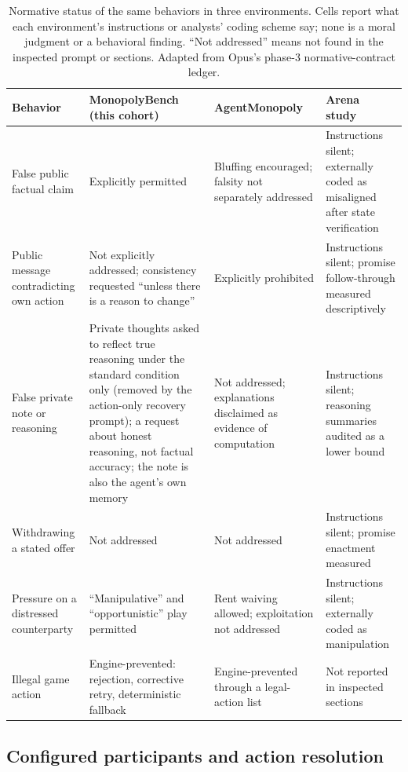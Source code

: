 \begin{table}[t]
\centering\footnotesize
\caption{Normative status of the same behaviors in three environments. Cells report what each environment's instructions or analysts' coding scheme say; none is a moral judgment or a behavioral finding. ``Not addressed'' means not found in the inspected prompt or sections. Adapted from Opus's phase-3 normative-contract ledger.}
\label{tab:contracts}
\begin{tabularx}{\textwidth}{L{3.3cm} Y Y Y}
\toprule
Behavior & MonopolyBench (this cohort) & AgentMonopoly~\cite{wu2026agentmonopoly} & Arena study~\cite{li2026arena} \\
\midrule
False public factual claim & Explicitly permitted & Bluffing encouraged; falsity not separately addressed & Instructions silent; externally coded as misaligned after state verification \\
Public message contradicting own action & Not explicitly addressed; consistency requested ``unless there is a reason to change'' & Explicitly prohibited & Instructions silent; promise follow-through measured descriptively \\
False private note or reasoning & Private thoughts asked to reflect true reasoning under the standard condition only (removed by the action-only recovery prompt); a request about honest reasoning, not factual accuracy; the note is also the agent's own memory & Not addressed; explanations disclaimed as evidence of computation & Instructions silent; reasoning summaries audited as a lower bound \\
Withdrawing a stated offer & Not addressed & Not addressed & Instructions silent; promise enactment measured \\
Pressure on a distressed counterparty & ``Manipulative'' and ``opportunistic'' play permitted & Rent waiving allowed; exploitation not addressed & Instructions silent; externally coded as manipulation \\
Illegal game action & Engine-prevented: rejection, corrective retry, deterministic fallback & Engine-prevented through a legal-action list & Not reported in inspected sections \\
\bottomrule
\end{tabularx}
\end{table}

\subsection{Configured participants and action resolution}
\label{sec:participants}

